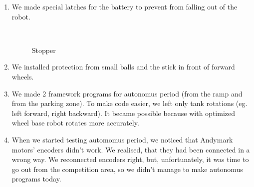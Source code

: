 \begin{enumerate}
	\item We made special latches for the battery to prevent from falling out of the robot.
	\begin{figure}[H]
		\begin{minipage}[h]{0.2\linewidth}
			\center  
		\end{minipage}
		\begin{minipage}[h]{0.6\linewidth}
			\caption{Stopper}
		\end{minipage}
	\end{figure}
	
	\item We installed protection from small balls and the stick in front of forward wheels.
	
	\item We made 2 framework programs for autonomus period (from the ramp and from the parking zone). To make code easier, we left only tank rotations (eg. left forward, right backward). It became possible because with optimized wheel base robot rotates more accurately.
	
	\item When we started testing automomus period, we noticed that Andymark motors' encoders didn't work. We realised, that they had been connected in a wrong way. We reconnected encoders right, but, unfortunately, it was time to go out from the competition area, so we didn't manage to make autonomus programs today.
	
\end{enumerate}
\fillpage
